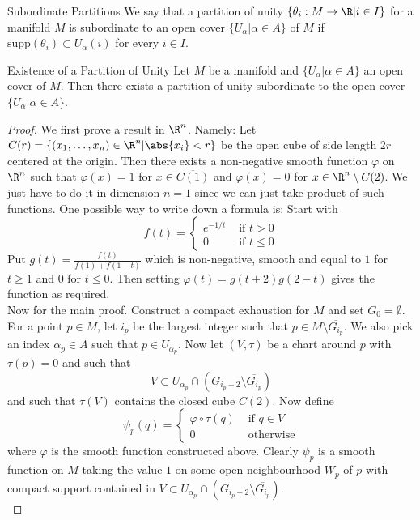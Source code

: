 \documentclass[a4paper]{article}
\begin{document}
\begin{defn}{Subordinate Partitions}{} We say that a partition of unity $\{\theta_i:M\to\R|i\in I\}$ for a manifold $M$ is subordinate to an open cover $\{U_\alpha|\alpha\in A\}$ of $M$ if $\text{supp}(\theta_i)\subset U_\alpha(i)$ for every $i\in I$. 
\end{defn}

\begin{thm}{Existence of a Partition of Unity}{} Let $M$ be a manifold and $\{U_\alpha|\alpha\in A\}$ an open cover of $M$. Then there exists a partition of unity subordinate to the open cover $\{U_\alpha|\alpha\in A\}$. 
\begin{proof}
We first prove a result in $\R^n$. Namely: Let $C(r)=\{(x_1,\dots,x_n)\in\R^n|\abs{x_i}<r\}$ be the open cube of side length $2r$ centered at the origin. Then there exists a non-negative smooth function $\varphi$ on $\R^n$ such that $\varphi(x)=1$ for $x\in\overline{C(1)}$ and $\varphi(x)=0$ for $x\in\R^n\setminus C(2)$. We just have to do it in dimension $n=1$ since we can just take product of such functions. One possible way to write down a formula is: Start with $$f(t)=\begin{cases}
e^{-1/t} & \text{ if }t>0\\
0 & \text{ if }t\leq 0
\end{cases}$$
Put $g(t)=\frac{f(t)}{f(1)+f(1-t)}$ which is non-negative, smooth and equal to $1$ for $t\geq 1$ and $0$ for $t\leq 0$. Then setting $\varphi(t)=g(t+2)g(2-t)$ gives the function as required. \\
Now for the main proof. Construct a compact exhaustion for $M$ and set $G_0=\emptyset$. For a point $p\in M$, let $i_p$ be the largest integer such that $p\in M\setminus\overline{G_{i_p}}$. We also pick an index $\alpha_p\in A$ such that $p\in U_{\alpha_p}$. Now let $(V,\tau)$ be a chart around $p$ with $\tau(p)=0$ and such that $$V\subset U_{\alpha_p}\cap(G_{i_p+2}\setminus\overline{G_{i_p}})$$ and such that $\tau(V)$ contains the closed cube $\overline{C(2)}$. Now define $$\psi_p(q)=\begin{cases}
\varphi\circ\tau(q) & \text{ if }q\in V\\
0 &\text{ otherwise}
\end{cases}$$ where $\varphi$ is the smooth function constructed above. Clearly $\psi_p$ is a smooth function on $M$ taking the value $1$ on some open neighbourhood $W_p$ of $p$ with compact support contained in $V\subset U_{\alpha_p}\cap(G_{i_p+2}\setminus\overline{G_{i_p}})$. \\

\end{proof}
\end{thm}
\end{document}
